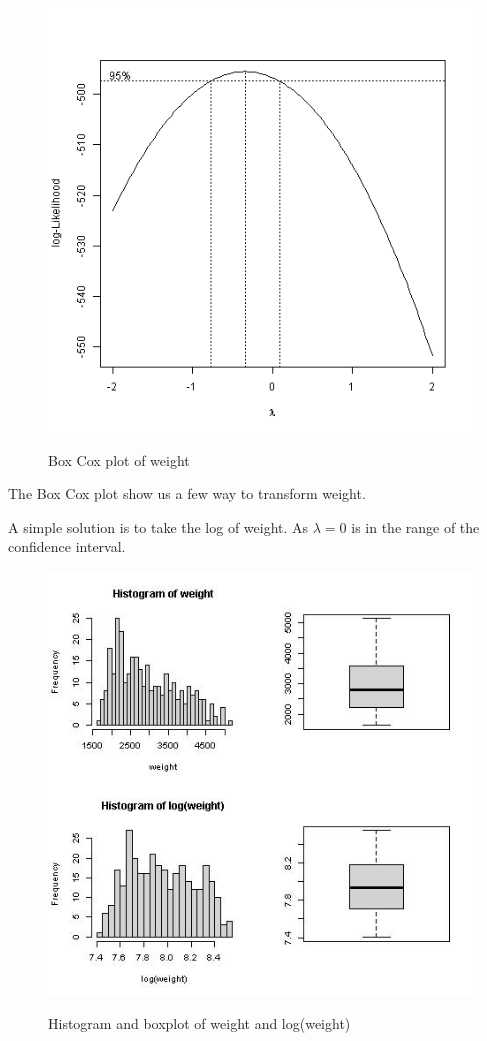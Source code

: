 \begin{figure}[H]
\centering
\includegraphics[scale=0.4]{img/weightboxcox.png}
\label{fig:my_label_with_H}
\caption{Box Cox plot of weight}
\end{figure}

The Box Cox plot show us a few way to transform weight.

A simple solution is to take the log of weight. As $\lambda = 0$ is in the range of the confidence interval.

\begin{figure}[H]
\centering
\includegraphics[scale=0.7]{img/weighttrans1.jpeg}
\label{fig:my_label_with_H}
\caption{Histogram and boxplot of weight and log(weight)}
\end{figure}


